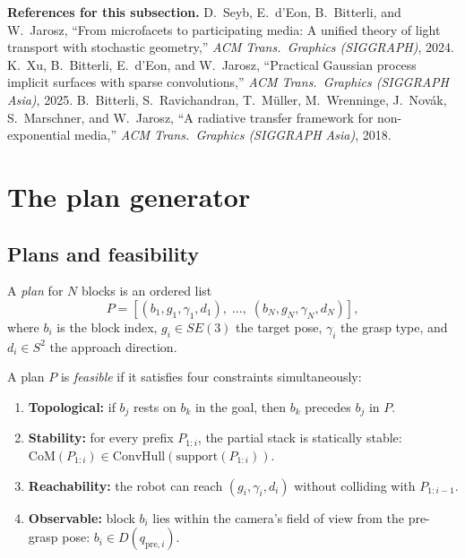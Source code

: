 \medskip
\noindent\textbf{References for this subsection.}\enspace
D.~Seyb, E.~d'Eon, B.~Bitterli, and W.~Jarosz,
``From microfacets to participating media: A unified theory of light
transport with stochastic geometry,''
\emph{ACM Trans.\ Graphics (SIGGRAPH)}, 2024.\enspace
K.~Xu, B.~Bitterli, E.~d'Eon, and W.~Jarosz,
``Practical Gaussian process implicit surfaces with sparse
convolutions,''
\emph{ACM Trans.\ Graphics (SIGGRAPH Asia)}, 2025.\enspace
B.~Bitterli, S.~Ravichandran, T.~M\"uller, M.~Wrenninge,
J.~Nov\'ak, S.~Marschner, and W.~Jarosz,
``A radiative transfer framework for non-exponential media,''
\emph{ACM Trans.\ Graphics (SIGGRAPH Asia)}, 2018.


\section{The plan generator}\label{sec:m-plangen}

\subsection{Plans and feasibility}

\begin{definition}[Plan]\label{def:m-plan}
A \emph{plan} for $N$ blocks is an ordered list
\[
  P = [(b_1, g_1, \gamma_1, d_1), \;\ldots,\; (b_N, g_N, \gamma_N, d_N)],
\]
where $b_i$ is the block index, $g_i \in SE(3)$ the target pose,
$\gamma_i$ the grasp type, and $d_i \in S^2$ the approach direction.
\end{definition}

\begin{definition}[Feasibility]\label{def:m-feasible}
A plan $P$ is \emph{feasible} if it satisfies four constraints
simultaneously:
\begin{enumerate}[label=(F\arabic*),nosep]
  \item \textbf{Topological:} if $b_j$ rests on $b_k$ in the goal,
  then $b_k$ precedes $b_j$ in $P$.
  \item \textbf{Stability:} for every prefix $P_{1:i}$, the partial
  stack is statically stable:
  $\mathrm{CoM}(P_{1:i}) \in
  \mathrm{ConvHull}(\mathrm{support}(P_{1:i}))$.
  \item \textbf{Reachability:} the robot can reach
  $(g_i, \gamma_i, d_i)$ without colliding with $P_{1:i-1}$.
  \item \textbf{Observable:} block $b_i$ lies within the camera's
  field of view from the pre-grasp pose:
  $b_i \in D(q_{\mathrm{pre},i})$.
\end{enumerate}
\end{definition}

